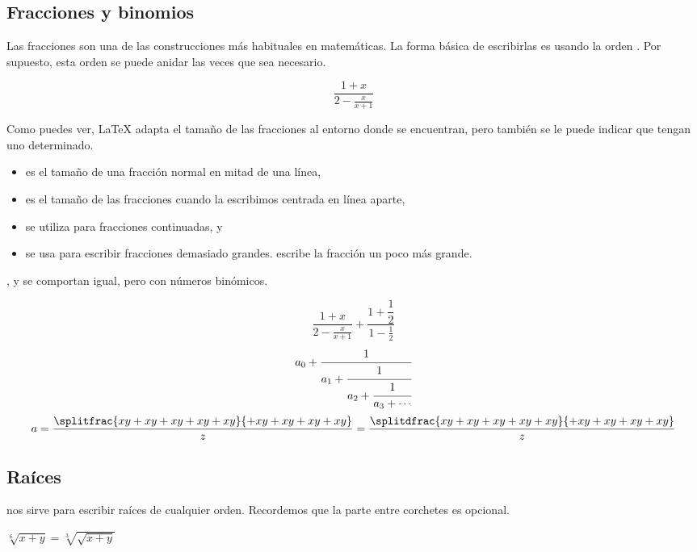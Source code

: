 \documentclass{article}
\numberwithin{equation}{section}
\theoremstyle{plain}
\theoremstyle{definition}
\theoremstyle{remark}
\begin{document}
\subsection{Fracciones y binomios} 
Las fracciones son una de las construcciones más habituales en matemáticas. La forma básica de escribirlas es usando la orden \texttt{}. Por supuesto, esta orden se puede anidar las veces que sea necesario.
\begin{codigo-lado}
\[\frac{1+x}{2-\frac{x}{x+1}}\] 
\end{codigo-lado}
Como puedes ver, \LaTeX{} adapta el tamaño de las fracciones al entorno donde se encuentran, pero también se le puede indicar que tengan uno determinado.
\begin{itemize}
	\item \texttt{\tfrac{}{}} es el tamaño de una fracción normal en mitad de una línea,
	\item \texttt{\dfrac{}{}} es el tamaño de las fracciones cuando la escribimos centrada en línea aparte,
	\item \texttt{\cfrac{}{}} se utiliza para fracciones continuadas, y
	\item \texttt{} se usa para escribir fracciones demasiado grandes. \texttt{} escribe la fracción un poco más grande.
\end{itemize}
\texttt{\binom{}{}}, \texttt{\tbinom{}{}} y \texttt{\dbinom{}{}} se comportan igual, pero con números binómicos.
\begin{codigo-arriba}
\[
\frac{1+x}{2-\frac{x}{x+1}} + \frac{1+\dfrac{1}{2}}{1-\frac{1}{2}}
\]
\[
  a_0+\cfrac{1}{a_1+\cfrac{1}{a_2+\cfrac{1}{a_3+\cdots}}}
\]    
\[ a=\frac{
          \splitfrac{xy + xy + xy + xy + xy}
                    {+ xy + xy + xy + xy}
}
{z} =\frac{
          \splitdfrac{xy + xy + xy + xy + xy}
                    {+ xy + xy + xy + xy}
    }{z} 
\]
\end{codigo-arriba}


\subsection{Raíces}

\texttt{\sqrt[]{}} nos sirve para escribir raíces de cualquier orden. Recordemos que la parte entre corchetes es opcional.
\begin{codigo-lado}
$\sqrt[6]{x+y}=\sqrt[3]{\sqrt{x+y}}$
\end{codigo-lado}
\end{document}
